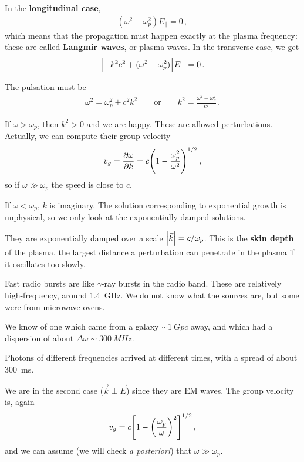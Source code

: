 \documentclass[main.tex]{subfiles}
\begin{document}
In the \textbf{longitudinal case},
%
\begin{align}
(\omega^2 - \omega _p^2) E_{\parallel} = 0
\,,
\end{align}
%
which means that the propagation must happen exactly at the plasma frequency: these are called \textbf{Langmir waves}, or plasma waves. 
In the transverse case, we get 
%
\begin{align}
\qty[ - k^2 c^2 + (\omega^2 - \omega _p^2)] E_\perp = 0
\,.
\end{align}

The pulsation must be 
%
\begin{align}
\omega^2 = \omega _p^2 + c^2 k^2
\qquad \text{or} \qquad
k^2 = \frac{\omega^2 - \omega^2_p}{c^2}
\,.
\end{align}

If \(\omega > \omega _p\), then \(k^2 > 0 \) and we are happy. These are allowed perturbations. 
Actually, we can compute their group velocity 
%
\begin{align}
v_g = \pdv{\omega }{k} = c \qty(1 - \frac{\omega_p^2}{\omega^2})^{1/2}
\,,
\end{align}
%
so if \(\omega \gg \omega _p\) the speed is close to \(c\). 

If \(\omega < \omega _p\), \(k\) is imaginary.
The solution corresponding to exponential growth is unphysical, so we only look at the exponentially damped solutions. 

They are exponentially damped over a scale \(\abs{\vec{k}} = c / \omega _p\).
This is the \textbf{skin depth} of the plasma, the largest distance a perturbation can penetrate in the plasma if it oscillates too slowly.


Fast radio bursts are like \(\gamma \)-ray bursts in the radio band.
These are relatively high-frequency, around \SI{1.4}{GHz}. 
We do not know what the sources are, but some were from microwave ovens. 

We know of one which came from a galaxy \(\sim \SI{1}{Gpc}\) away, and which had a dispersion of about \(\Delta \omega \sim \SI{300}{MHz}\). 

Photons of different frequencies arrived at different times, with a spread of about \SI{300}{ms}. 

We are in the second case (\(\vec{k} \perp \vec{E}\)) since they are EM waves. 
The group velocity is, again
%
\begin{align}
v_g = c \qty[ 1 - \qty(\frac{\omega _p}{\omega})^2]^{1/2}
\,,
\end{align}
%
and we can assume (we will check \emph{a posteriori}) that \(\omega \gg \omega _p\). 
\end{document}
